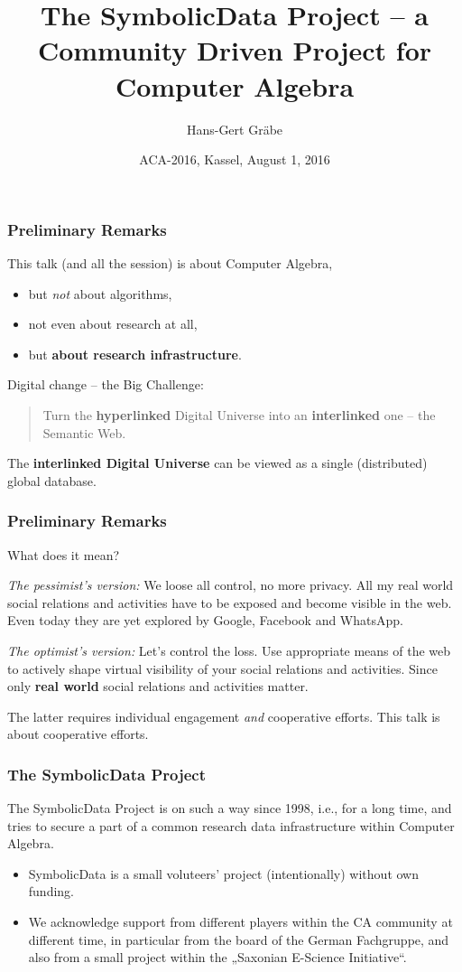 \documentclass{beamer}
\title[The SymbolicData Project]{The SymbolicData Project -- a Community Driven
  Project for Computer Algebra}
\author{Hans-Gert Gr\"abe}
\institute[]{Leipzig University, Germany\\
\texttt{http://bis.informatik.uni-leipzig.de/HansGertGraebe}}
\date{ACA-2016, Kassel, August 1, 2016}
\begin{document}
\begin{frame}
\titlepage
\end{frame}

\begin{frame}
\frametitle{Preliminary Remarks}

This talk (and all the session) is about Computer Algebra,
\begin{itemize}
\item but \emph{not} about algorithms,
\item not even about research at all,
\item but \textbf{about research infrastructure}.
\end{itemize}

Digital change -- the Big Challenge:
\begin{quote}
  Turn the \textbf{hyperlinked} Digital Universe into an \textbf{interlinked}
  one -- the Semantic Web.
\end{quote}

The \textbf{interlinked Digital Universe} can be viewed as a single
(distributed) global database.
\end{frame}

\begin{frame}
\frametitle{Preliminary Remarks}
What does it mean?

\emph{The pessimist's version:} We loose all control, no more privacy. All my
real world social relations and activities have to be exposed and become
visible in the web. Even today they are yet explored by Google, Facebook and
WhatsApp.

\emph{The optimist's version:} Let's control the loss. Use appropriate means of
the web to actively shape virtual visibility of your social relations and
activities. Since only \textbf{real world} social relations and activities
matter.

The latter requires individual engagement \emph{and} cooperative efforts.  
This talk is about cooperative efforts.

\end{frame}

\begin{frame}\frametitle{The SymbolicData Project}
The SymbolicData Project is on such a way since 1998, i.e., for a long time,
and tries to secure a part of a common research data infrastructure within
Computer Algebra.
\begin{itemize}
\item SymbolicData is a small voluteers' project (intentionally) without own
  funding.
\item We acknowledge support from different players within the CA community at
  different time, in particular from the board of the German Fachgruppe, and
  also from a small project within the „Saxonian E-Science Initiative“.
\end{itemize}
\end{frame}
\end{document}
